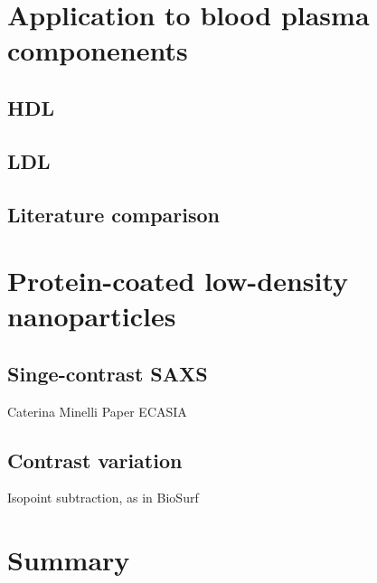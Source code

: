 \section{Application to blood plasma componenents}
\subsection{HDL}
\subsection{LDL}
\subsection{Literature comparison}

\section{Protein-coated low-density nanoparticles}
\subsection{Singe-contrast SAXS}
Caterina Minelli Paper ECASIA
\subsection{Contrast variation}
Isopoint subtraction, as in BioSurf

\section{Summary}




